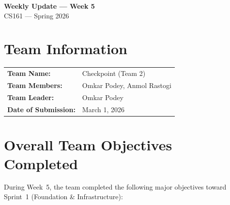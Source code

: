 \documentclass[11pt]{article}
\begin{document}
\begin{center}
    {\LARGE \textbf{Weekly Update --- Week 5}} \\[6pt]
    {\large CS161 --- Spring 2026}
\end{center}

\vspace{0.5em}

\section{Team Information}

\begin{tabularx}{\textwidth}{@{}lX@{}}
    \textbf{Team Name:}       & Checkpoint (Team 2) \\
    \textbf{Team Members:}    & Omkar Podey, Anmol Rastogi \\
    \textbf{Team Leader:}     & Omkar Podey \\
    \textbf{Date of Submission:} & March 1, 2026 \\
\end{tabularx}

\section{Overall Team Objectives Completed}

During Week~5, the team completed the following major objectives toward Sprint~1 (Foundation \& Infrastructure):
\end{document}

